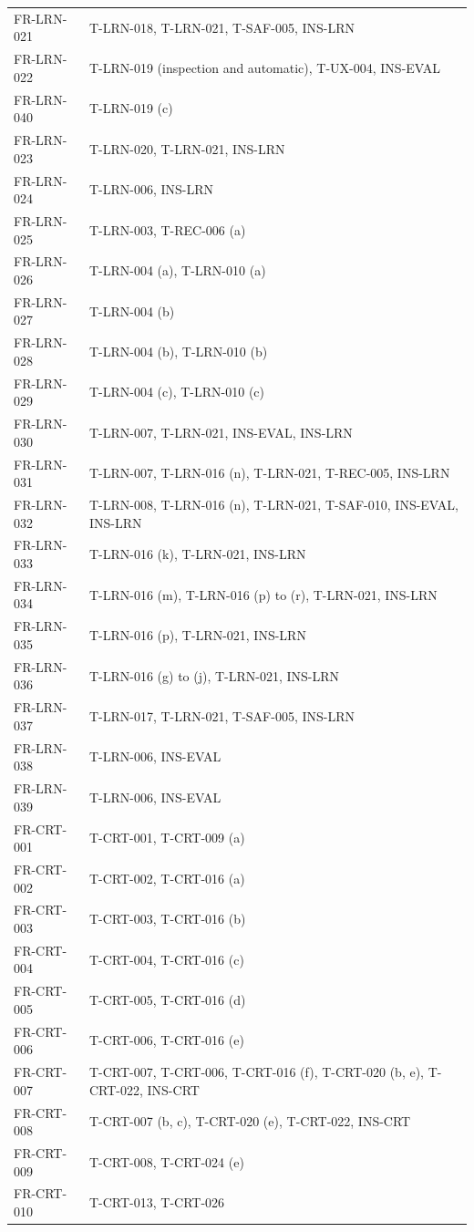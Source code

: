 \documentclass[12pt, titlepage]{article}
\begin{document}
{\begin{longtable}{@{}>{\raggedright\arraybackslash}p{}%
>{\raggedright\arraybackslash}p{}@{}}
FR-LRN-021 & T-LRN-018, T-LRN-021, T-SAF-005, INS-LRN\\
FR-LRN-022 & T-LRN-019 (inspection and automatic), T-UX-004, INS-EVAL\\
FR-LRN-040 & T-LRN-019 (c)\\
FR-LRN-023 & T-LRN-020, T-LRN-021, INS-LRN\\
FR-LRN-024 & T-LRN-006, INS-LRN\\
FR-LRN-025 & T-LRN-003, T-REC-006 (a)\\
FR-LRN-026 & T-LRN-004 (a), T-LRN-010 (a)\\
FR-LRN-027 & T-LRN-004 (b)\\
FR-LRN-028 & T-LRN-004 (b), T-LRN-010 (b)\\
FR-LRN-029 & T-LRN-004 (c), T-LRN-010 (c)\\
FR-LRN-030 & T-LRN-007, T-LRN-021, INS-EVAL, INS-LRN\\
FR-LRN-031 & T-LRN-007, T-LRN-016 (n), T-LRN-021, T-REC-005, INS-LRN\\
FR-LRN-032 & T-LRN-008, T-LRN-016 (n), T-LRN-021, T-SAF-010, INS-EVAL,
INS-LRN\\
FR-LRN-033 & T-LRN-016 (k), T-LRN-021, INS-LRN\\
FR-LRN-034 & T-LRN-016 (m), T-LRN-016 (p) to (r), T-LRN-021, INS-LRN\\
FR-LRN-035 & T-LRN-016 (p), T-LRN-021, INS-LRN\\
FR-LRN-036 & T-LRN-016 (g) to (j), T-LRN-021, INS-LRN\\
FR-LRN-037 & T-LRN-017, T-LRN-021, T-SAF-005, INS-LRN\\
FR-LRN-038 & T-LRN-006, INS-EVAL\\
FR-LRN-039 & T-LRN-006, INS-EVAL\\
FR-CRT-001 & T-CRT-001, T-CRT-009 (a)\\
FR-CRT-002 & T-CRT-002, T-CRT-016 (a)\\
FR-CRT-003 & T-CRT-003, T-CRT-016 (b)\\
FR-CRT-004 & T-CRT-004, T-CRT-016 (c)\\
FR-CRT-005 & T-CRT-005, T-CRT-016 (d)\\
FR-CRT-006 & T-CRT-006, T-CRT-016 (e)\\
FR-CRT-007 & T-CRT-007, T-CRT-006, T-CRT-016 (f), T-CRT-020 (b, e), T-CRT-022, INS-CRT\\
FR-CRT-008 & T-CRT-007 (b, c), T-CRT-020 (e), T-CRT-022, INS-CRT\\
FR-CRT-009 & T-CRT-008, T-CRT-024 (e)\\
FR-CRT-010 & T-CRT-013, T-CRT-026\\

\end{longtable}}
\end{document}

